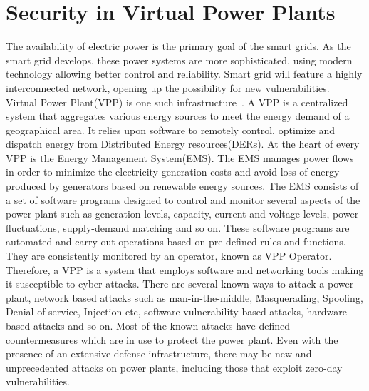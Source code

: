 \section{Security in Virtual Power Plants}

The availability of electric power is the primary goal of the smart grids. As the smart grid develops, these power systems are more sophisticated, using modern technology allowing better control and reliability. Smart grid will feature a highly interconnected network, opening up the possibility for new vulnerabilities.\\


Virtual Power Plant(VPP) is one such infrastructure~\cite{pudjianto2007virtual}. A VPP is a centralized system that aggregates various energy sources to meet the energy demand of a geographical area. It relies upon software to remotely control, optimize and dispatch energy from Distributed Energy resources(DERs). At the heart of every VPP is the Energy Management System(EMS). The EMS manages power flows in order to minimize the electricity generation costs and avoid loss of energy produced by generators based on renewable energy sources. The EMS consists of a set of software programs designed to control and monitor several aspects of the power plant such as generation levels, capacity, current and voltage levels, power fluctuations, supply-demand matching and so on. These software programs are automated and carry out operations based on pre-defined rules and functions. They are consistently monitored by an operator, known as VPP Operator. Therefore, a VPP is a system that employs software and networking tools making it susceptible to cyber attacks. There are several known ways to attack a power plant, network based attacks such as man-in-the-middle, Masquerading, Spoofing, Denial of service, Injection etc, software vulnerability based attacks, hardware based attacks and so on. Most of the known attacks have defined countermeasures which are in use to protect the power plant. Even with the presence of an extensive defense infrastructure, there may be new and unprecedented attacks on power plants, including those that exploit zero-day vulnerabilities. 
\newline
